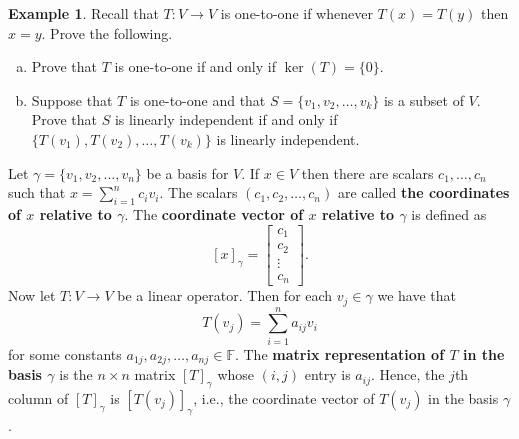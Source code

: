 \documentclass[12pt]{article}
\newcommand{\field}{\mathbb{F}}
\newcommand{\tv}{T:V\rightarrow V}
\theoremstyle{definition}
\newtheorem{example}{Example}[section]
\begin{document}
\begin{example}
Recall that $\tv$ is one-to-one if whenever $T(x)=T(y)$ then $x=y$.  Prove the following.
\begin{enumerate}[(a)]
\item Prove that $T$ is one-to-one if and only if $\ker(T)=\{0\}$.
\item Suppose that $T$ is one-to-one and that $S=\{v_1,v_2,\ldots,v_k\}$ is a subset of $V$.  Prove that $S$ is linearly independent if and only if $\{T(v_1),T(v_2),\ldots,T(v_k)\}$ is linearly independent.
\end{enumerate}
\end{example}

Let $\gamma=\{v_1,v_2,\ldots,v_n\}$ be a basis for $V$.  If $x\in V$ then there are scalars $c_1,\ldots,c_n$ such that $x=\sum_{i=1}^n c_i v_i$.  The scalars $(c_1,c_2,\ldots,c_n)$ are called \textbf{the coordinates of $x$ relative to $\gamma$}.  The \textbf{coordinate vector of $x$ relative to $\gamma$} is defined as
\[
[x]_\gamma = \begin{bmatrix}c_1\\c_2\\\vdots\\c_n\end{bmatrix}.
\]
Now let $\tv$ be a linear operator.  Then for each $v_j\in\gamma$ we have that
\[
T(v_j) = \sum_{i=1}^n a_{ij} v_i
\]
for some constants $a_{1j},a_{2j},\ldots,a_{nj}\in\mathbb{F}$.  The \textbf{matrix representation of $T$ in the basis $\gamma$} is the $n\times n$ matrix $[T]_\gamma$ whose $(i,j)$ entry is $a_{ij}$.  Hence, the $j$th column of $[T]_\gamma$ is $[T(v_j)]_\gamma$, i.e., the coordinate vector of $T(v_j)$ in the basis $\gamma$.

\end{document}

